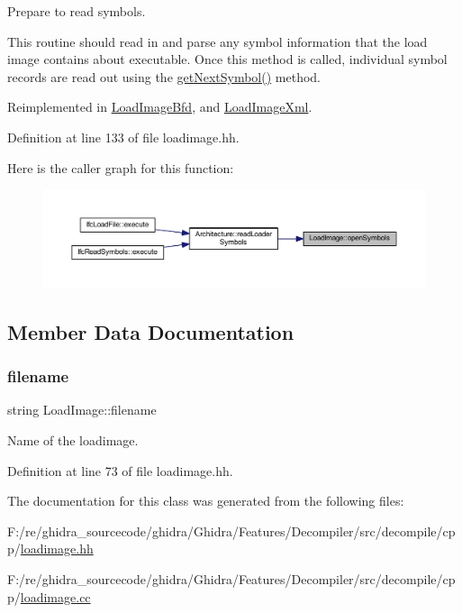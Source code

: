 Prepare to read symbols. 

This routine should read in and parse any symbol information that the load image contains about executable. Once this method is called, individual symbol records are read out using the \mbox{\hyperlink{class_load_image_af4a887cf44c719c576bb05605a4c5c7e}{get\+Next\+Symbol()}} method. 

Reimplemented in \mbox{\hyperlink{class_load_image_bfd_a55a11f9c90d067643acb55b197179878}{Load\+Image\+Bfd}}, and \mbox{\hyperlink{class_load_image_xml_abf281fd9e155951f168ddab099dadf47}{Load\+Image\+Xml}}.



Definition at line 133 of file loadimage.\+hh.

Here is the caller graph for this function\+:
\nopagebreak
\begin{figure}[H]
\begin{center}
\leavevmode
\includegraphics[width=350pt]{class_load_image_a5b17f1d68413ab802966bdc7aa07cc73_icgraph}
\end{center}
\end{figure}


\subsection{Member Data Documentation}
\mbox{\label{class_load_image_a4d95f3891fc75d7549277d5f26fa06fc}} 
\subsubsection{\texorpdfstring{filename}{filename}}
{\footnotesize\ttfamily string Load\+Image\+::filename\hspace{0.3cm}{\ttfamily [protected]}}



Name of the loadimage. 



Definition at line 73 of file loadimage.\+hh.



The documentation for this class was generated from the following files\+:\begin{DoxyCompactItemize}
\item 
F\+:/re/ghidra\+\_\+sourcecode/ghidra/\+Ghidra/\+Features/\+Decompiler/src/decompile/cpp/\mbox{\hyperlink{loadimage_8hh}{loadimage.\+hh}}\item 
F\+:/re/ghidra\+\_\+sourcecode/ghidra/\+Ghidra/\+Features/\+Decompiler/src/decompile/cpp/\mbox{\hyperlink{loadimage_8cc}{loadimage.\+cc}}\end{DoxyCompactItemize}
